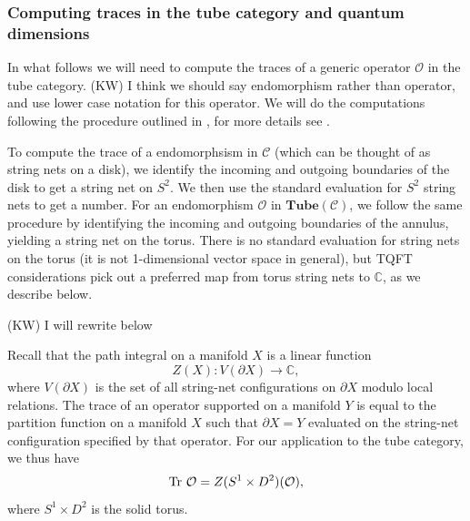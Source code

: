 \documentclass[12pt,a4paper]{article}
\newcounter{arrow}
\newcommand{\ra}{\rightarrow}
\newcommand{\cc}{\mathbb{C}}
\newcommand{\mcc}{\mathcal{C}}
\newcommand{\mco}{\mathcal{O}}
\newcommand\be            {\begin{equation}}
\newcommand\ee            {\end{equation}}
\newcommand{\p}{\partial}
\newcommand{\tube}{\textbf{Tube}}
\newcommand{\kw}[1]{{\color{kwcolor}\footnotesize{(KW) #1}}}
\begin{document}
\subsubsection{Computing traces in the tube category and quantum dimensions} \label{qdims_and_traces}


In what follows we will need to compute the traces of a generic operator $\mco$ in the tube category. 
\kw{I think we should say endomorphism rather than operator, and use lower case notation for this operator.}
We will do the computations following the procedure outlined in \cite{Walker2006}, for more details see \cite{ghosh2016,das2014}.

To compute the trace of a endomorphsism in $\mcc$ (which can be thought of
as string nets on a disk), we identify the incoming and outgoing
boundaries of the disk to get a string net on $S^2$.
We then use the standard evaluation for $S^2$ string nets to get a number.
For an endomorphism $\mco$ in $\tube(\mcc)$, we follow the same procedure by identifying the incoming and outgoing
boundaries of the annulus, yielding a string net on the torus.
There is no standard evaluation for string nets on the torus (it is not 1-dimensional vector space in general),
but TQFT considerations pick out a preferred map from torus string nets to $\cc$, as we describe below.


\kw{I will rewrite below}

Recall that the path integral on a manifold $X$ is a linear function
\be Z(X) : V(\p X) \ra \cc,\ee
where $V(\p X)$ is the set of all string-net configurations on $\p X$ modulo local relations.
The trace of an operator supported on a manifold $Y$ is equal to the partition function on a manifold $X$ 
such that $\p X = Y$ evaluated on the string-net configuration specified by that operator. 
For our application to the tube category, we thus have 
\be {\rm Tr}\ \mco = Z(S^1 \times D^2)(\mco),\ee
where $S^1\times D^2$ is the solid torus. 
\end{document}
